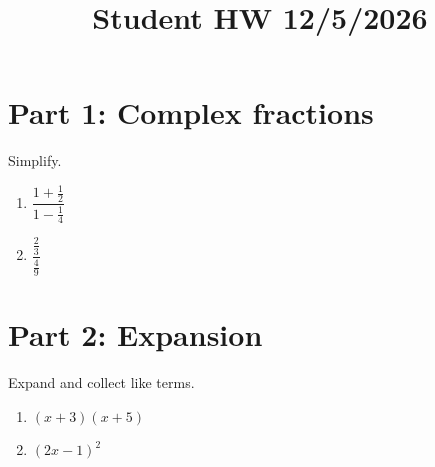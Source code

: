 \documentclass{article}
\title{Student HW 12/5/2026}
\date{}
\begin{document}
\maketitle
{}
\newpage
\section*{Part 1: Complex fractions}
Simplify.
\begin{enumerate}
  \item $\dfrac{1 + \frac{1}{2}}{1 - \frac{1}{4}}$
  \item $\dfrac{\frac{2}{3}}{\frac{4}{9}}$
\end{enumerate}
\section*{Part 2: Expansion}
Expand and collect like terms.
\begin{enumerate}
  \item $(x+3)(x+5)$
  \item $(2x-1)^2$
\end{enumerate}
\end{document}
